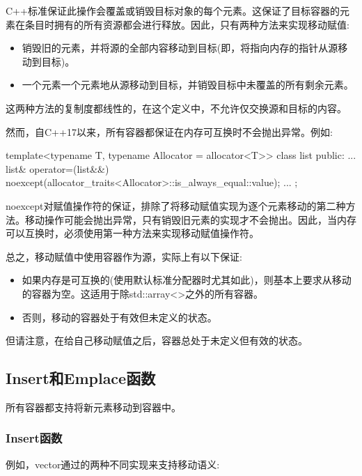C++标准保证此操作会覆盖或销毁目标对象的每个元素。这保证了目标容器的元素在条目时拥有的所有资源都会进行释放。因此，只有两种方法来实现移动赋值:

\begin{itemize}
	\item 销毁旧的元素，并将源的全部内容移动到目标(即，将指向内存的指针从源移动到目标)。
	\item 一个元素一个元素地从源移动到目标，并销毁目标中未覆盖的所有剩余元素。
\end{itemize}

这两种方法的复制度都线性的，在这个定义中，不允许仅交换源和目标的内容。

然而，自C++17以来，所有容器都保证在内存可互换时不会抛出异常。例如:

\begin{cppcode}
template<typename T, typename Allocator = allocator<T>>
class list {
public:
	...
	list& operator=(list&&)
	noexcept(allocator_traits<Allocator>::is_always_equal::value);
	...
};
\end{cppcode}

noexcept对赋值操作符的保证，排除了将移动赋值实现为逐个元素移动的第二种方法。移动操作可能会抛出异常，只有销毁旧元素的实现才不会抛出。因此，当内存可以互换时，必须使用第一种方法来实现移动赋值操作符。

总之，移动赋值中使用容器作为源，实际上有以下保证:

\begin{itemize}
	\item 如果内存是可互换的(使用默认标准分配器时尤其如此)，则基本上要求从移动的容器为空。这适用于除std::array<>之外的所有容器。
	\item 否则，移动的容器处于有效但未定义的状态。
\end{itemize}

但请注意，在给自己移动赋值之后，容器总处于未定义但有效的状态。

\subsection{Insert和Emplace函数}

所有容器都支持将新元素移动到容器中。

\subsubsection{Insert函数}

例如，vector通过的两种不同实现来支持移动语义:

